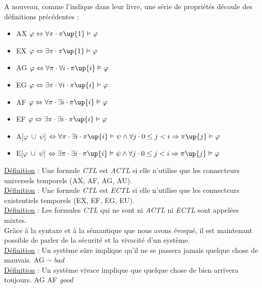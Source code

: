 \documentclass[runningheads,a4paper]{llncs}
\begin{document}
\noindent A nouveau, comme l'indique \cite{principle} dans leur livre, une série de propriétés découle des définitions précédentes : 
\begin{itemize}
\item AX $\varphi \Leftrightarrow \forall \pi \cdot \pi\up{1} \vDash \varphi$
\item EX $\varphi \Leftrightarrow \exists \pi \cdot \pi\up{1} \vDash \varphi$
\item AG $\varphi \Leftrightarrow \forall \pi \cdot \forall i \cdot \pi\up{i} \vDash \varphi$
\item EG $\varphi \Leftrightarrow \exists \pi \cdot \forall i \cdot \pi\up{i} \vDash \varphi$
\item AF $\varphi \Leftrightarrow \forall \pi \cdot \exists i \cdot \pi\up{i} \vDash \varphi$
\item EF $\varphi \Leftrightarrow \exists \pi \cdot \exists i \cdot \pi\up{i} \vDash \varphi$
\item A[$\varphi \ \cup \ \psi$]  $\Leftrightarrow \forall \pi \cdot \exists i \cdot \pi\up{i} \vDash 	\psi \land \forall j \cdot 0 \leq j < i \Rightarrow \pi\up{j} \vDash \varphi$
\item E[$\varphi \ \cup \ \psi$]  $\Leftrightarrow \exists \pi \cdot \exists i \cdot \pi\up{i} \vDash 	\psi \land \forall j \cdot 0 \leq j < i \Rightarrow \pi\up{j} \vDash \varphi$ \\
\end{itemize}

\noindent \underline{Définition} : Une formule \textit{CTL} est \textit{ACTL} si elle n'utilise que les connecteurs universels temporels (AX, AF, AG, AU).\\
\underline{Définition} : Une formule \textit{CTL} est \textit{ECTL} si elle n'utilise que les connecteurs existentiels temporels (EX, EF, EG, EU).\\
\underline{Définition} : Les formules \textit{CTL} qui ne sont ni \textit{ACTL} ni \textit{ECTL} sont appelées mixtes.\\

\noindent Grâce à la syntaxe et à la sémantique que nous avons évoqué, il est maintenant possible de parler de la sécurité et la vivacité d'un système.\\

\noindent \underline{Définition} : Un système sûre implique qu'il ne se passera jamais quelque chose de mauvais. AG $\lnot$ \textit{bad} \\
\underline{Définition} : Un système vivace implique que quelque chose de bien arrivera toujours. AG AF \textit{good}
\end{document}
